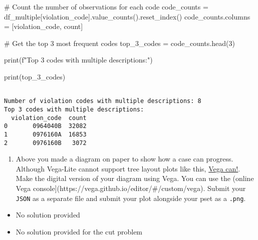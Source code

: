 \documentclass[
  letterpaper,
  DIV=11,
  numbers=noendperiod]{scrartcl}
\newenvironment{Shaded}{\begin{snugshade}}{\end{snugshade}}
\newcommand{\BuiltInTok}[1]{\textcolor[rgb]{0.00,0.23,0.31}{#1}}
\newcommand{\CommentTok}[1]{\textcolor[rgb]{0.37,0.37,0.37}{#1}}
\newcommand{\DecValTok}[1]{\textcolor[rgb]{0.68,0.00,0.00}{#1}}
\newcommand{\NormalTok}[1]{\textcolor[rgb]{0.00,0.23,0.31}{#1}}
\newcommand{\OperatorTok}[1]{\textcolor[rgb]{0.37,0.37,0.37}{#1}}
\newcommand{\SpecialStringTok}[1]{\textcolor[rgb]{0.13,0.47,0.30}{#1}}
\newcommand{\StringTok}[1]{\textcolor[rgb]{0.13,0.47,0.30}{#1}}
\providecommand{\tightlist}{%
  \setlength{\itemsep}{0pt}\setlength{\parskip}{0pt}}\usepackage{longtable,booktabs,array}
\begin{document}
\begin{Shaded}
\begin{Highlighting}[]
\CommentTok{\# Count the number of observations for each code}
\NormalTok{code\_counts }\OperatorTok{=}\NormalTok{ df\_multiple[}\StringTok{\textquotesingle{}violation\_code\textquotesingle{}}\NormalTok{].value\_counts().reset\_index()}
\NormalTok{code\_counts.columns }\OperatorTok{=}\NormalTok{ [}\StringTok{\textquotesingle{}violation\_code\textquotesingle{}}\NormalTok{, }\StringTok{\textquotesingle{}count\textquotesingle{}}\NormalTok{]}

\CommentTok{\# Get the top 3 most frequent codes}
\NormalTok{top\_3\_codes }\OperatorTok{=}\NormalTok{ code\_counts.head(}\DecValTok{3}\NormalTok{)}

\BuiltInTok{print}\NormalTok{(}\SpecialStringTok{f"Top 3 codes with multiple descriptions:"}\NormalTok{) }

\BuiltInTok{print}\NormalTok{(top\_3\_codes)}
\end{Highlighting}
\end{Shaded}

\begin{verbatim}

Number of violation codes with multiple descriptions: 8
Top 3 codes with multiple descriptions:
  violation_code  count
0       0964040B  32082
1       0976160A  16853
2       0976160B   3072
\end{verbatim}

\begin{enumerate}
\def\labelenumi{\arabic{enumi}.}
\setcounter{enumi}{1}
\tightlist
\item
  Above you made a diagram on paper to show how a case can progress.
  Although Vega-Lite cannot support tree layout plots like this,
  \href{https://vega.github.io/vega/examples/tree-layout/}{Vega can!}.
  Make the digital version of your diagram using Vega. You can use the
  (online Vega console{]}(https://vega.github.io/editor/\#/custom/vega).
  Submit your \texttt{JSON} as a separate file and submit your plot
  alongside your pset as a \texttt{.png}.
\end{enumerate}

\begin{itemize}
\item
  No solution provided
\item
  No solution provided for the cut problem
\end{itemize}
\end{document}
